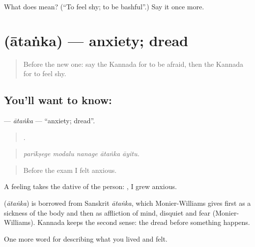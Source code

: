 \begin{tcolorbox}[breakable,colback=teal!4,colframe=teal!35!black,title={Before you move on}]
What does  mean? (\textquotedblleft{}To feel shy; to be bashful\textquotedblright{}.) Say it once more.
\end{tcolorbox}
\section[\texorpdfstring{\kn{ಆತಂಕ} (ātaṅka)}{ಆತಂಕ (ātaṅka)}]{ (ātaṅka) — anxiety; dread}

\label{lesson:KA-C490-atanka}



\begin{quote}
Before the new one: say the Kannada for to be afraid, then the Kannada for to feel shy.
\end{quote}

\subsection*{You'll want to know: }
\textbf{} — \emph{ātaṅka} — \textquotedblleft{}anxiety; dread\textquotedblright{}.

\begin{quote}
    .
\end{quote}

\begin{quote}
\emph{parīkṣege modalu nanage ātaṅka āyitu.}
\end{quote}

\begin{quote}
Before the exam I felt anxious.
\end{quote}

A feeling takes the dative of the person:   , I grew anxious.

\begin{cousinweb}
\textbf{} (\emph{ātaṅka}) is borrowed from Sanskrit \emph{ātaṅka}, which Monier-Williams gives first as a sickness of the body and then as affliction of mind, disquiet and fear (Monier-Williams). Kannada keeps the second sense: the dread before something happens.
\end{cousinweb}

\begin{grammarlens}[title={What you've built}]
One more word for describing what you lived and felt.
\end{grammarlens}

